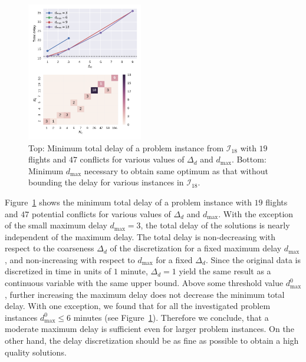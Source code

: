 \begin{figure}[htpb]
\centering
\includegraphics[width=0.45\textwidth]{./pics/delay_only_cp_results.pdf}
\caption[Effect of discretization on solution quality]{Top: Minimum total delay of a problem instance from $\mathcal{I}_{18}$ with $19$ flights and $47$ conflicts for various values of $\Delta_d$ and $d_{\max}$.
Bottom: Minimum $d_\text{max}$ necessary to obtain same optimum as that without bounding the delay for various instances in $\mathcal I_{18}$.}
\label{fig:delay_only_cp_results}
\end{figure}

Figure~\ref{fig:delay_only_cp_results} shows the minimum total delay of a problem instance with $19$ flights and $47$ potential conflicts for various values of $\Delta_d$ and $d_{\max}$.
With the exception of the small maximum delay $d_\text{max} = 3$, the total delay of the solutions is nearly independent of the maximum delay.
The total delay is non-decreasing with respect to the coarseness $\Delta_d$ of the discretization for a fixed maximum delay $d_{\max}$, and non-increasing with respect to $d_{\max}$ for a fixed $\Delta_d$.
Since the original data is discretized in time in units of $1$ minute, $\Delta_d=1$ yield the same result as a continuous variable with the same upper bound.
Above some threshold value $d^0_\text{max}$, further increasing the maximum delay does not decrease the minimum total delay.
With one exception, we found that for all the investigated problem instances $d^0_\text{max}\leq6$ minutes (see Figure~\ref{fig:delay_only_cp_results}).
Therefore we conclude, that a moderate maximum delay is sufficient even for larger problem instances.
On the other hand, the delay discretization should be as fine as possible to obtain a high quality solutions.



